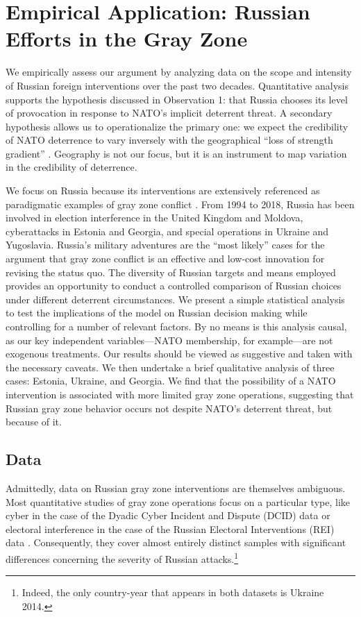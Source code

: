 \documentclass[11pt,letterpaper,pdftex,dvipsnames,table]{article}
\begin{document}
\section{Empirical Application: Russian Efforts in the Gray Zone}
We empirically assess our argument by analyzing data on the scope and intensity of Russian foreign interventions over the past two decades. Quantitative analysis supports the hypothesis discussed in Observation 1: that Russia chooses its level of provocation in response to NATO's implicit deterrent threat. A secondary hypothesis allows us to operationalize the primary one: we expect the credibility of NATO deterrence to vary inversely with the geographical ``loss of strength gradient'' \citep{boulding_conflictdefensegeneral_1962}. Geography is not our focus, but it is an instrument to map variation in the credibility of deterrence.

We focus on Russia because its interventions are extensively referenced as paradigmatic examples of gray zone conflict \citep{marten_putinchoicesexplaining_2015, driscoll_friendsthesebrinkmanship_2016, chivvis_hybridwarrussian_2017, jasper_russiancyberoperations_2020}. From 1994 to 2018, Russia has been involved in election interference in the United Kingdom and Moldova, cyberattacks in Estonia and Georgia, and special operations in Ukraine and Yugoslavia. Russia's military adventures are the ``most likely'' cases for the argument that gray zone conflict is an effective and low-cost innovation for revising the status quo. The diversity of Russian targets and means employed provides an opportunity to conduct a controlled comparison of Russian choices under different deterrent circumstances. We present a simple statistical analysis to test the implications of the model on Russian decision making while controlling for a number of relevant factors. By no means is this analysis causal, as our key independent variables---NATO membership, for example---are not exogenous treatments. Our results should be viewed as suggestive and taken with the necessary caveats. We then undertake a brief qualitative analysis of three cases: Estonia, Ukraine, and Georgia. We find that the possibility of a NATO intervention is associated with more limited gray zone operations, suggesting that Russian gray zone behavior occurs not despite NATO's deterrent threat, but because of it.

\subsection{Data}
Admittedly, data on Russian gray zone interventions are themselves ambiguous. Most quantitative studies of gray zone operations focus on a particular type, like cyber in the case of the Dyadic Cyber Incident and Dispute (DCID) data or electoral interference in the case of the Russian Electoral Interventions (REI) data \citep{valeriano_dynamicscyberconflict_2014, casey_russianelectoralinterventions_2017}. Consequently, they cover almost entirely distinct samples with significant differences concerning the severity of Russian attacks.\footnote{Indeed, the only country-year that appears in both datasets is Ukraine 2014.}
\end{document}

